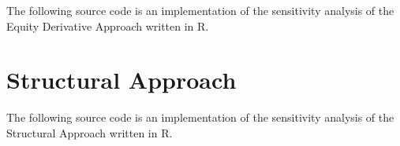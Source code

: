 The following source code is an implementation of the sensitivity analysis of the Equity Derivative Approach \citep{de2011pricing} written in R.
 


\section{Structural Approach} \label{sensistructural}

The following source code is an implementation of the sensitivity analysis of the Structural Approach \citep{pennacchi2010structural} written in R.
 

